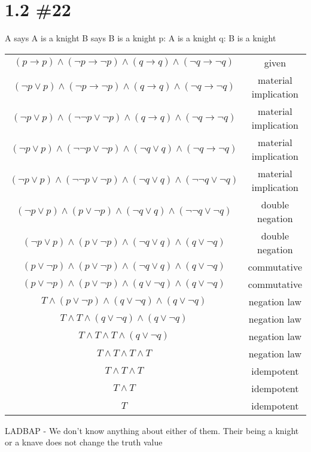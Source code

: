 \documentclass[h]{article}
\begin{document}
\section*{1.2 \#22}
A says A is a knight \newline
B says B is a knight \newline
p: A is a knight \newline
q: B is a knight \newline
\begin{tabular}{|c c|} \hline
$(p \rightarrow p) \wedge (\neg p \rightarrow \neg p) \wedge (q \rightarrow q) \wedge (\neg q \rightarrow \neg q)$ & given\\
$(\neg p \vee p) \wedge (\neg p \rightarrow \neg p) \wedge (q \rightarrow q) \wedge (\neg q \rightarrow \neg q)$ & material implication\\
$(\neg p \vee p) \wedge (\neg \neg p \vee \neg p) \wedge (q \rightarrow q) \wedge (\neg q \rightarrow \neg q)$ & material implication\\
$(\neg p \vee p) \wedge (\neg \neg p \vee \neg p) \wedge (\neg q \vee q) \wedge (\neg q \rightarrow \neg q)$ & material implication\\
$(\neg p \vee p) \wedge (\neg \neg p \vee \neg p) \wedge (\neg q \vee q) \wedge (\neg \neg q \vee \neg q)$ & material implication\\
$(\neg p \vee p) \wedge ( p \vee \neg p) \wedge (\neg q \vee q) \wedge (\neg \neg q \vee \neg q)$ & double negation\\
$(\neg p \vee p) \wedge ( p \vee \neg p) \wedge (\neg q \vee q) \wedge (q \vee \neg q)$ & double negation\\
$( p \vee \neg p) \wedge ( p \vee \neg p) \wedge (\neg q \vee q) \wedge (q \vee \neg q)$ & commutative\\
$( p \vee \neg p) \wedge ( p \vee \neg p) \wedge (q \vee \neg q) \wedge (q \vee \neg q)$ & commutative\\
$T \wedge ( p \vee \neg p) \wedge (q \vee \neg q) \wedge (q \vee \neg q)$ & negation law\\
$T \wedge T \wedge (q \vee \neg q) \wedge (q \vee \neg q)$ & negation law\\
$T \wedge T \wedge T \wedge (q \vee \neg q)$ & negation law\\
$T \wedge T \wedge T \wedge T$ & negation law\\
$T \wedge T \wedge T$ & idempotent\\
$T \wedge T$ & idempotent\\
$T$ & idempotent\\ \hline
\end{tabular} \newline \newline
LADBAP - We don't know anything about either of them. Their being a knight or a knave does not change the truth value
\end{document}
